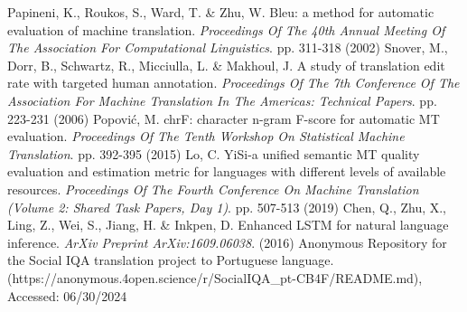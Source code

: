 \documentclass[runningheads]{llncs}
\begin{document}
\begin{thebibliography}{8}
Papineni, K., Roukos, S., Ward, T. \& Zhu, W. Bleu: a method for automatic evaluation of machine translation. {\em Proceedings Of The 40th Annual Meeting Of The Association For Computational Linguistics}. pp. 311-318 (2002)
Snover, M., Dorr, B., Schwartz, R., Micciulla, L. \& Makhoul, J. A study of translation edit rate with targeted human annotation. {\em Proceedings Of The 7th Conference Of The Association For Machine Translation In The Americas: Technical Papers}. pp. 223-231 (2006)
Popović, M. chrF: character n-gram F-score for automatic MT evaluation. {\em Proceedings Of The Tenth Workshop On Statistical Machine Translation}. pp. 392-395 (2015)
Lo, C. YiSi-a unified semantic MT quality evaluation and estimation metric for languages with different levels of available resources. {\em Proceedings Of The Fourth Conference On Machine Translation (Volume 2: Shared Task Papers, Day 1)}. pp. 507-513 (2019)
Chen, Q., Zhu, X., Ling, Z., Wei, S., Jiang, H. \& Inkpen, D. Enhanced LSTM for natural language inference. {\em ArXiv Preprint ArXiv:1609.06038}. (2016)
 Anonymous Repository for the Social IQA translation project to Portuguese language. (https://anonymous.4open.science/r/SocialIQA\_pt-CB4F/README.md), Accessed: 06/30/2024
\end{thebibliography}
\end{document}

